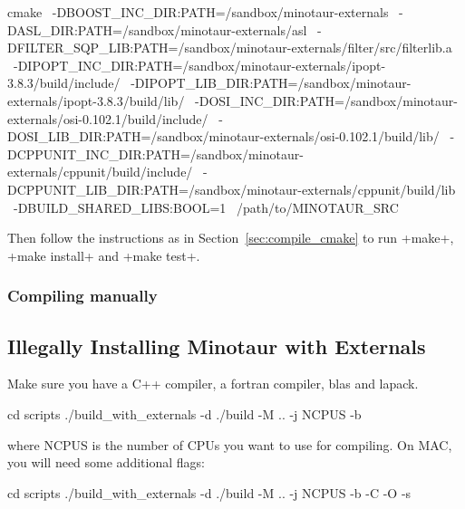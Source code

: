 \begin{codeenv}
cmake                                                                         \ 
  -DBOOST_INC_DIR:PATH=/sandbox/minotaur-externals                            \
  -DASL_DIR:PATH=/sandbox/minotaur-externals/asl                              \
  -DFILTER_SQP_LIB:PATH=/sandbox/minotaur-externals/filter/src/filterlib.a    \
  -DIPOPT_INC_DIR:PATH=/sandbox/minotaur-externals/ipopt-3.8.3/build/include/ \
  -DIPOPT_LIB_DIR:PATH=/sandbox/minotaur-externals/ipopt-3.8.3/build/lib/     \
  -DOSI_INC_DIR:PATH=/sandbox/minotaur-externals/osi-0.102.1/build/include/   \
  -DOSI_LIB_DIR:PATH=/sandbox/minotaur-externals/osi-0.102.1/build/lib/       \
  -DCPPUNIT_INC_DIR:PATH=/sandbox/minotaur-externals/cppunit/build/include/   \
  -DCPPUNIT_LIB_DIR:PATH=/sandbox/minotaur-externals/cppunit/build/lib        \
  -DBUILD_SHARED_LIBS:BOOL=1                                                  \
  /path/to/MINOTAUR_SRC
\end{codeenv}
Then follow the instructions as in Section~\ref{sec:compile_cmake} to run
\code+make+, \code+make install+ and \code+make test+.

\subsubsection{Compiling manually}
\subsection{Illegally Installing Minotaur with Externals}
Make sure you have a C++ compiler, a fortran compiler, blas and lapack.
\begin{codeenv}
cd scripts
./build_with_externals -d ./build -M .. -j NCPUS -b
\end{codeenv}
where NCPUS is the number of CPUs you want to use for compiling.
On MAC, you will need some additional flags:
\begin{codeenv}
cd scripts
./build_with_externals -d ./build -M .. -j NCPUS -b -C -O -s
\end{codeenv}

